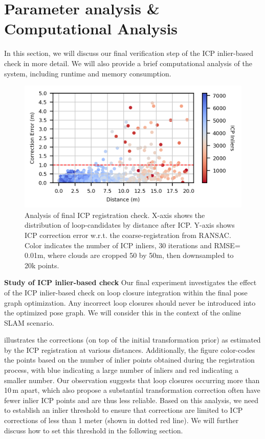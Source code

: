 \section{Parameter analysis \& Computational Analysis}
In this section, we will discuss our final verification step of the ICP inlier-based check in more detail. We will also provide a brief computational analysis of the system, including runtime and memory consumption. \vspace{5pt}
\begin{figure}[htbp]
  \centering
  \includegraphics[width=0.8\linewidth]{pics/exp_4_ablation_icp_inliers_4cm}
  \caption{Analysis of final ICP registration check. X-axis shows the distribution of loop-candidates by distance after ICP.
  Y-axis shows ICP correction error w.r.t. the coarse-registration from RANSAC. Color indicates the number of ICP inliers,  30 iterations and RMSE= 0.01m, where clouds are cropped 50 by 50m, then downsampled to 20k points.}
  \label{fig:icp_inliers}
\end{figure}

\noindent \textbf{Study of ICP inlier-based check}\hspace{0.5em} Our final experiment investigates the effect of the ICP inlier-based check on loop closure integration within the final pose graph optimization. Any incorrect loop closures should never be introduced into the optimized pose graph. We will consider this in the context of the online SLAM scenario. 

 illustrates the corrections (on top of the initial transformation prior) as estimated by the ICP registration at various distances. Additionally, the figure color-codes the points based on the number of inlier points obtained during the registration process, with blue indicating a large number of inliers and red indicating a smaller number.
Our observation suggests that loop closures occurring more than 10\,m apart, which also propose a substantial transformation correction often have fewer inlier ICP points and are thus less reliable.
Based on this analysis, we need to establish an inlier threshold to ensure that corrections are limited to ICP corrections of less than 1 meter (shown in dotted red line). We will further discuss how to set this threshold in the following section.
\vspace{7pt}


